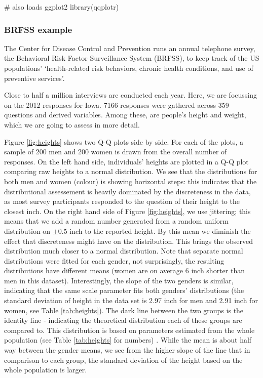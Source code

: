 \begin{Schunk}
\begin{Sinput}
# also loads ggplot2
library(qqplotr)
\end{Sinput}
\end{Schunk}

\subsubsection{BRFSS example}\label{brfss-example}

The Center for Disease Control and Prevention runs an annual telephone
survey, the Behavioral Risk Factor Surveillance System (BRFSS), to keep
track of the US populations' `health-related risk behaviors, chronic
health conditions, and use of preventive services'.

Close to half a million interviews are conducted each year. Here, we are
focussing on the 2012 responses for Iowa. 7166 responses were gathered
across 359 questions and derived variables. Among these, are people's
height and weight, which we are going to assess in more detail.

Figure \ref{fig:heights} shows two Q-Q plots side by side. For each of
the plots, a sample of 200 men and 200 women is drawn from the overall
number of responses. On the left hand side, individuals' heights are
plotted in a Q-Q plot comparing raw heights to a normal distribution. We
see that the distributions for both men and women (colour) is showing
horizontal steps: this indicates that the distributional assessement is
heavily dominated by the discreteness in the data, as most survey
participants responded to the question of their height to the closest
inch. On the right hand side of Figure \ref{fig:heights}, we use
jittering; this means that we add a random number generated from a
random uniform distribution on \(\pm 0.5\) inch to the reported height.
By this mean we diminish the effect that discreteness might have on the
distribution. This brings the observed distribution much closer to a
normal distribution. Note that separate normal distributions were fitted
for each gender, not surprisingly, the resulting distributions have
different means (women are on average 6 inch shorter than men in this
dataset). Interestingly, the slope of the two genders is similar,
indicating that the same scale parameter fits both genders'
distributions (the standard deviation of height in the data set is 2.97
inch for men and 2.91 inch for women, see Table \ref{tab:heights}). The
dark line between the two groups is the identity line - indicating the
theoretical distribution each of these groups are compared to. This
distribution is based on parameters estimated from the whole population
(see Table \ref{tab:heights} for numbers) . While the mean is about half
way between the gender means, we see from the higher slope of the line
that in comparison to each group, the standard deviation of the height
based on the whole population is larger.

